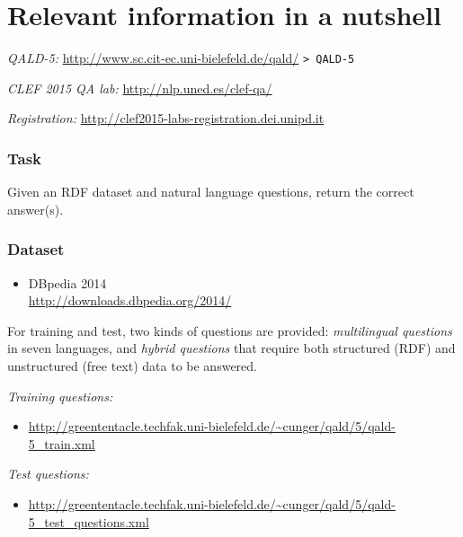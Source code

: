 \documentclass[a4paper]{article}
\begin{document}
{\newpage

\section{Relevant information in a nutshell}

{\em QALD-5:} \url{http://www.sc.cit-ec.uni-bielefeld.de/qald/} \texttt{> QALD-5}

{\em CLEF 2015 QA lab:} \url{http://nlp.uned.es/clef-qa/}

\emph{Registration:} \url{http://clef2015-labs-registration.dei.unipd.it}



\subsubsection*{Task}

Given an RDF dataset and natural language questions, return the correct answer(s). 

\subsubsection*{Dataset}

\begin{itemize} 
\item DBpedia 2014\\ \url{http://downloads.dbpedia.org/2014/}
\end{itemize} 

For training and test, two kinds of questions are provided: 
\emph{multilingual questions} in seven languages, 
and \emph{hybrid questions} that require both structured (RDF) and unstructured (free text) data to be answered.

{\em Training questions:} 

\vspace{-.3cm}

\begin{itemize} 
\item \url{http://greententacle.techfak.uni-bielefeld.de/~cunger/qald/5/qald-5_train.xml} 
\end{itemize} 

{\em Test questions:} 

\vspace{-.3cm}

\begin{itemize}
\item \url{http://greententacle.techfak.uni-bielefeld.de/~cunger/qald/5/qald-5_test_questions.xml} 
\end{itemize}

}
\end{document}
